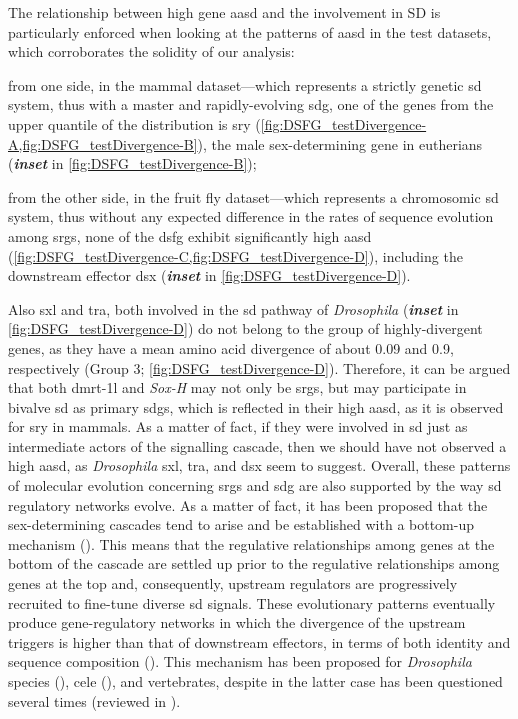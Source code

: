 The relationship between high gene \gls{aasd} and the involvement in SD is particularly enforced when looking at the patterns of \gls{aasd} in the test datasets, which corroborates the solidity of our analysis:
\begin{inlinelist}
	\item from one side, in the mammal dataset—which represents a strictly genetic \gls{sd} system, thus with a master and rapidly-evolving \gls{sdg}, one of the genes from the \fivepercent{} upper quantile of the distribution is \gls{sry} (\cref{fig:DSFG_testDivergence-A,fig:DSFG_testDivergence-B}), the male sex-determining gene in eutherians (\textbf{\textit{inset}} in \cref{fig:DSFG_testDivergence-B});
	\item from the other side, in the fruit fly dataset—which represents a chromosomic \gls{sd} system, thus without any expected difference in the rates of sequence evolution among \glspl{srg}, none of the \gls{dsfg} exhibit significantly high \gls{aasd} (\cref{fig:DSFG_testDivergence-C,fig:DSFG_testDivergence-D}), including the downstream effector \gls{dsx} (\textit{\textbf{inset}} in \cref{fig:DSFG_testDivergence-D}).
\end{inlinelist}
Also \gls{sxl} and \gls{tra}, both involved in the \gls{sd} pathway of \textit{Drosophila} (\textit{\textbf{inset}} in \cref{fig:DSFG_testDivergence-D}) do not belong to the group of highly-divergent genes, as they have a mean amino acid divergence of about 0.09 and 0.9, respectively (Group 3; \cref{fig:DSFG_testDivergence-D}). Therefore, it can be argued that both \gls{dmrt-1l} and \textit{Sox-H} may not only be \glspl{srg}, but may participate in bivalve \gls{sd} as primary \glspl{sdg}, which is reflected in their high \gls{aasd}, as it is observed for \gls{sry} in mammals. As a matter of fact, if they were involved in \gls{sd} just as intermediate actors of the signalling cascade, then we should have not observed a high \gls{aasd}, as \textit{Drosophila} \gls{sxl}, \gls{tra}, and \gls{dsx} seem to suggest. Overall, these patterns of molecular evolution concerning \glspl{srg} and \gls{sdg} are also supported by the way \gls{sd} regulatory networks evolve. As a matter of fact, it has been proposed that the sex-determining cascades tend to arise and be established with a bottom-up mechanism (). This means that the regulative relationships among genes at the bottom of the cascade are settled up prior to the regulative relationships among genes at the top and, consequently, upstream regulators are progressively recruited to fine-tune diverse \gls{sd} signals. These evolutionary patterns eventually produce gene-regulatory networks in which the divergence of the upstream triggers is higher than that of downstream effectors, in terms of both identity and sequence composition (). This mechanism has been proposed for \textit{Drosophila} species (), \gls{cele} (), and vertebrates, despite in the latter case has been questioned several times (reviewed in ).

